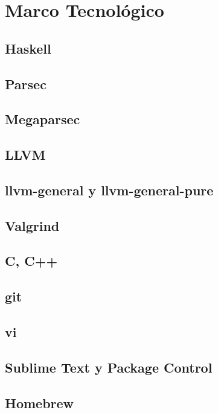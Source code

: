 \chapter{Marco Tecnológico}
\label{capitulo2}

\section{Haskell}

\section{Parsec}

\section{Megaparsec}

\section{LLVM}

\section{llvm-general y llvm-general-pure}

\section{Valgrind}

\section{C, C++}

\section{git}

\section{vi}

\section{Sublime Text y Package Control}

\section{Homebrew}
